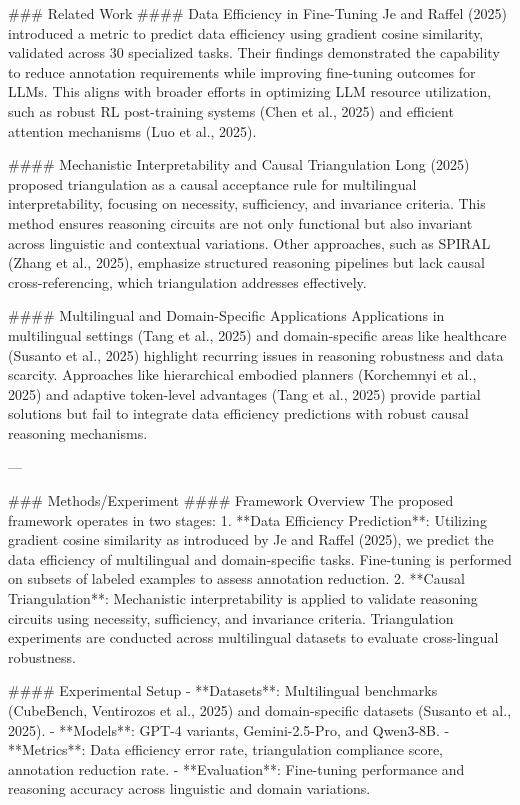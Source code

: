 ### Related Work  
#### Data Efficiency in Fine-Tuning  
Je and Raffel (2025) introduced a metric to predict data efficiency using gradient cosine similarity, validated across 30 specialized tasks. Their findings demonstrated the capability to reduce annotation requirements while improving fine-tuning outcomes for LLMs. This aligns with broader efforts in optimizing LLM resource utilization, such as robust RL post-training systems (Chen et al., 2025) and efficient attention mechanisms (Luo et al., 2025).

#### Mechanistic Interpretability and Causal Triangulation  
Long (2025) proposed triangulation as a causal acceptance rule for multilingual interpretability, focusing on necessity, sufficiency, and invariance criteria. This method ensures reasoning circuits are not only functional but also invariant across linguistic and contextual variations. Other approaches, such as SPIRAL (Zhang et al., 2025), emphasize structured reasoning pipelines but lack causal cross-referencing, which triangulation addresses effectively.

#### Multilingual and Domain-Specific Applications  
Applications in multilingual settings (Tang et al., 2025) and domain-specific areas like healthcare (Susanto et al., 2025) highlight recurring issues in reasoning robustness and data scarcity. Approaches like hierarchical embodied planners (Korchemnyi et al., 2025) and adaptive token-level advantages (Tang et al., 2025) provide partial solutions but fail to integrate data efficiency predictions with robust causal reasoning mechanisms.

---

### Methods/Experiment  
#### Framework Overview  
The proposed framework operates in two stages:  
1. **Data Efficiency Prediction**: Utilizing gradient cosine similarity as introduced by Je and Raffel (2025), we predict the data efficiency of multilingual and domain-specific tasks. Fine-tuning is performed on subsets of labeled examples to assess annotation reduction.  
2. **Causal Triangulation**: Mechanistic interpretability is applied to validate reasoning circuits using necessity, sufficiency, and invariance criteria. Triangulation experiments are conducted across multilingual datasets to evaluate cross-lingual robustness.

#### Experimental Setup  
- **Datasets**: Multilingual benchmarks (CubeBench, Ventirozos et al., 2025) and domain-specific datasets (Susanto et al., 2025).  
- **Models**: GPT-4 variants, Gemini-2.5-Pro, and Qwen3-8B.  
- **Metrics**: Data efficiency error rate, triangulation compliance score, annotation reduction rate.  
- **Evaluation**: Fine-tuning performance and reasoning accuracy across linguistic and domain variations.

